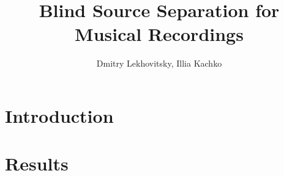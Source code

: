 \documentclass{article}
\title{ Blind Source Separation for Musical Recordings }
\author{ Dmitry Lekhovitsky, Illia Kachko }
\date{ }
\begin{document}
\maketitle

\section{Introduction}


\section{Results}

\end{document}
